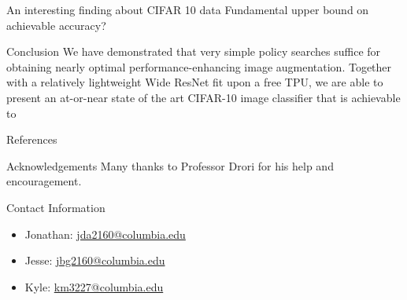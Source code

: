 \documentclass[final]{beamer}
\newlength{\onecolwid}
\begin{document}
\begin{frame}[t]
\begin{columns}[t]
\begin{column}{\onecolwid}
\begin{block}{An interesting finding about CIFAR 10 data}
Fundamental upper bound on achievable accuracy?
\end{block}


\begin{block}{Conclusion}
We have demonstrated that very simple policy searches suffice for obtaining nearly optimal performance-enhancing image augmentation. Together with a relatively lightweight Wide ResNet fit upon a free TPU, we are able to present an at-or-near state of the art CIFAR-10 image classifier that is achievable to 

\end{block}

% 
% 
% 

\begin{block}{References}


{\small


}
\end{block}

\begin{block}{Acknowledgements}
Many thanks to Professor Drori for his help and encouragement. \\
\end{block}


\begin{alertblock}{Contact Information}
\begin{itemize}
\item Jonathan: \href{mailto:jda2160@columbia.edu}{jda2160@columbia.edu}
\item Jesse: \href{mailto:jbg2160@columbia.edu}{jbg2160@columbia.edu}
\item Kyle: \href{mailto:km3227@columbia.edu}{km3227@columbia.edu}
\end{itemize}


\end{alertblock}
\end{column}
\end{columns}
\end{frame}
\end{document}
